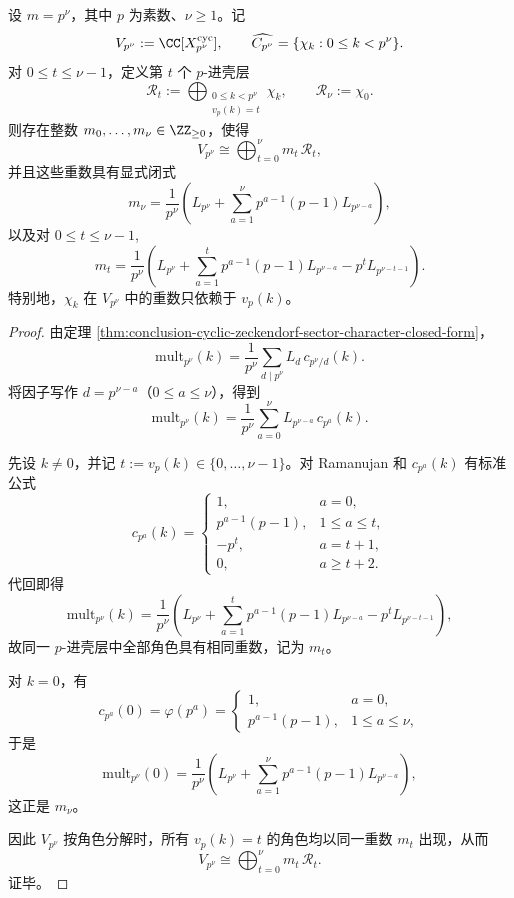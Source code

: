 \begin{theorem}\label{thm:conclusion-cyclic-zeckendorf-primepower-shell-rigidity}
设 \(m=p^\nu\)，其中 \(p\) 为素数、\(\nu\ge 1\)。记
\[
V_{p^\nu}:=\CC[X_{p^\nu}^{\mathrm{cyc}}],
\qquad
\widehat{C_{p^\nu}}=\{\chi_k:0\le k<p^\nu\}.
\]
对 \(0\le t\le \nu-1\)，定义第 \(t\) 个 \(p\)-进壳层
\[
\mathcal R_t:=\bigoplus_{\substack{0\le k<p^\nu\\ v_p(k)=t}}\chi_k,
\qquad
\mathcal R_\nu:=\chi_0.
\]
则存在整数 \(m_0,\dots,m_\nu\in\ZZ_{\ge 0}\)，使得
\[
V_{p^\nu}\cong \bigoplus_{t=0}^{\nu} m_t\,\mathcal R_t,
\]
并且这些重数具有显式闭式
\[
m_\nu=
\frac1{p^\nu}
\left(
L_{p^\nu}+\sum_{a=1}^{\nu}p^{a-1}(p-1)L_{p^{\nu-a}}
\right),
\]
以及对 \(0\le t\le \nu-1\),
\[
m_t=
\frac1{p^\nu}
\left(
L_{p^\nu}
+\sum_{a=1}^{t}p^{a-1}(p-1)L_{p^{\nu-a}}
-p^t L_{p^{\nu-t-1}}
\right).
\]
特别地，\(\chi_k\) 在 \(V_{p^\nu}\) 中的重数只依赖于 \(v_p(k)\)。
\end{theorem}
\begin{proof}
由定理 \ref{thm:conclusion-cyclic-zeckendorf-sector-character-closed-form}，
\[
\mathrm{mult}_{p^\nu}(k)=\frac1{p^\nu}\sum_{d\mid p^\nu}L_d\,c_{p^\nu/d}(k).
\]
将因子写作 \(d=p^{\nu-a}\)（\(0\le a\le \nu\)），得到
\[
\mathrm{mult}_{p^\nu}(k)=\frac1{p^\nu}\sum_{a=0}^{\nu}L_{p^{\nu-a}}\,c_{p^a}(k).
\]

先设 \(k\neq 0\)，并记 \(t:=v_p(k)\in\{0,\dots,\nu-1\}\)。对 Ramanujan 和 \(c_{p^a}(k)\) 有标准公式
\[
c_{p^a}(k)=
\begin{cases}
1, & a=0,\\[1mm]
p^{a-1}(p-1), & 1\le a\le t,\\[1mm]
-p^t, & a=t+1,\\[1mm]
0, & a\ge t+2.
\end{cases}
\]
代回即得
\[
\mathrm{mult}_{p^\nu}(k)
=
\frac1{p^\nu}
\left(
L_{p^\nu}
+\sum_{a=1}^{t}p^{a-1}(p-1)L_{p^{\nu-a}}
-p^t L_{p^{\nu-t-1}}
\right),
\]
故同一 \(p\)-进壳层中全部角色具有相同重数，记为 \(m_t\)。

对 \(k=0\)，有
\[
c_{p^a}(0)=\varphi(p^a)=
\begin{cases}
1, & a=0,\\
p^{a-1}(p-1), & 1\le a\le \nu,
\end{cases}
\]
于是
\[
\mathrm{mult}_{p^\nu}(0)
=
\frac1{p^\nu}
\left(
L_{p^\nu}+\sum_{a=1}^{\nu}p^{a-1}(p-1)L_{p^{\nu-a}}
\right),
\]
这正是 \(m_\nu\)。

因此 \(V_{p^\nu}\) 按角色分解时，所有 \(v_p(k)=t\) 的角色均以同一重数 \(m_t\) 出现，从而
\[
V_{p^\nu}\cong \bigoplus_{t=0}^{\nu} m_t\,\mathcal R_t.
\]
证毕。
\end{proof}

